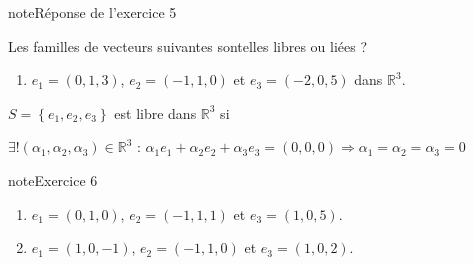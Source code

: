 \documentclass[letterpaper,10pt,french]{jupyterBook}
\begin{document}
\begin{sphinxadmonition}{note}{Réponse de l’exercice 5}

\sphinxAtStartPar
Les familles de vecteurs suivantes sont\sphinxhyphen{}elles libres ou liées ?
\begin{enumerate}
%
\item {} 
\sphinxAtStartPar
\(e_1=(0,1,3)\), \(e_2=(-1,1,0)\) et \(e_3=(-2,0,5)\) dans \(\mathbb{R}^3\).

\end{enumerate}

\sphinxAtStartPar
\( S = \left\{  e_1, e_2, e_3 \right\} \) est libre dans \(\mathbb{R}^3\) si

\sphinxAtStartPar
\(\exists! (\alpha_1, \alpha_2, \alpha_3) \in \mathbb{R}^3\) : \(\alpha_1 e_1 + \alpha_2 e_2 + \alpha_3 e_3= (0,0,0) \Rightarrow \alpha_1= \alpha_2 = \alpha_3 = 0 \)
\end{sphinxadmonition}

\begin{sphinxadmonition}{note}{Exercice 6}

\sphinxAtStartPar
{}
\begin{enumerate}
%
\item {} 
\sphinxAtStartPar
\(e_1 =(0,1,0)\), \(e_2 =(-1,1,1)\) et \(e_3 =(1,0,5)\).

\item {} 
\sphinxAtStartPar
\(e_1=(1,0,-1)\), \(e_2=(-1,1,0)\) et \(e_3=(1,0,2)\).

\end{enumerate}
\end{sphinxadmonition}
\end{document}
